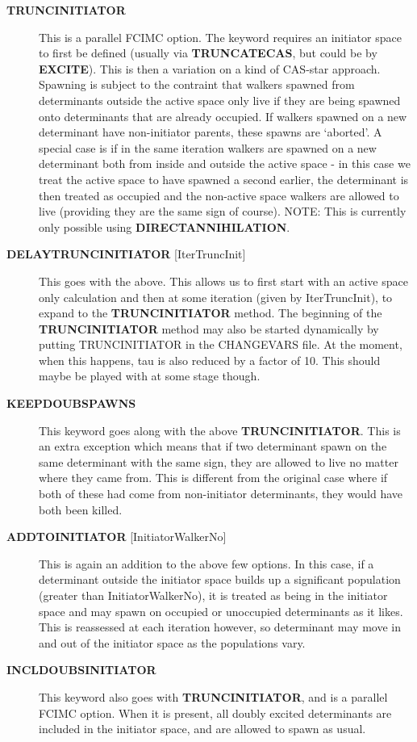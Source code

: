 \documentclass[openany,a4paper,10pt,english]{manual}
\begin{document}
\begin{description}
\item[\textbf{TRUNCINITIATOR}] \leavevmode
This is a parallel FCIMC option.  The keyword requires an initiator space to first be defined (usually
via \textbf{TRUNCATECAS}, but could be by \textbf{EXCITE}).
This is then a variation on a kind of CAS-star approach.  Spawning is subject to the contraint
that walkers spawned from determinants outside the active space only live if they are being spawned onto
determinants that are already occupied.  If walkers spawned on a new determinant have non-initiator parents,
these spawns are `aborted'.  A special case is if in the same iteration walkers are spawned on a new
determinant both from inside and outside the active space - in this case we treat the active space to have
spawned a second earlier, the determinant is then treated as occupied and the non-active space walkers are
allowed to live (providing they are the same sign of course).
NOTE: This is currently only possible using \textbf{DIRECTANNIHILATION}.

\item[\textbf{DELAYTRUNCINITIATOR} {[}IterTruncInit{]}] \leavevmode
This goes with the above.  This allows us to first start with an active space only calculation and then at some
iteration (given by IterTruncInit), to expand to the \textbf{TRUNCINITIATOR} method.  The beginning of the
\textbf{TRUNCINITIATOR} method may also be started dynamically by putting TRUNCINITIATOR in the CHANGEVARS file.
At the moment, when this happens, tau is also reduced by a factor of 10.  This should maybe be played with at
some stage though.

\item[\textbf{KEEPDOUBSPAWNS}] \leavevmode
This keyword goes along with the above \textbf{TRUNCINITIATOR}.  This is an extra exception which means that if
two determinant spawn on the same determinant with the same sign, they are allowed to live no matter where they
came from.  This is different from the original case where if both of these had come from non-initiator
determinants, they would have both been killed.

\item[\textbf{ADDTOINITIATOR} {[}InitiatorWalkerNo{]}] \leavevmode
This is again an addition to the above few options.  In this case, if a determinant outside the initiator space
builds up a significant population (greater than InitiatorWalkerNo), it is treated as being in the initiator
space and may spawn on occupied or unoccupied determinants as it likes.  This is reassessed at each iteration
however, so determinant may move in and out of the initiator space as the populations vary.

\item[\textbf{INCLDOUBSINITIATOR}] \leavevmode
This keyword also goes with \textbf{TRUNCINITIATOR}, and is a parallel FCIMC option.  When it is present, all doubly
excited determinants are included in the initiator space, and are allowed to spawn as usual.

\end{description}
\end{document}
